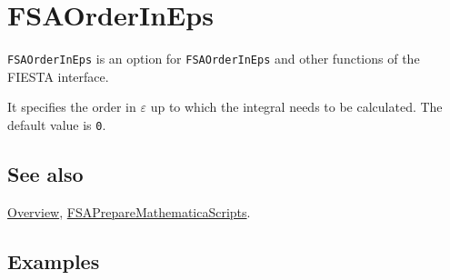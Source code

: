 \documentclass[../FeynHelpersManual.tex]{subfiles}
\begin{document}
\hypertarget{fsaorderineps}{
\section{FSAOrderInEps}\label{fsaorderineps}}

\texttt{FSAOrderInEps} is an option for \texttt{FSAOrderInEps} and other
functions of the FIESTA interface.

It specifies the order in \(\varepsilon\) up to which the integral needs
to be calculated. The default value is \texttt{0}.

\subsection{See also}

\hyperlink{toc}{Overview},
\hyperlink{fsapreparemathematicascripts}{FSAPrepareMathematicaScripts}.

\subsection{Examples}
\end{document}
